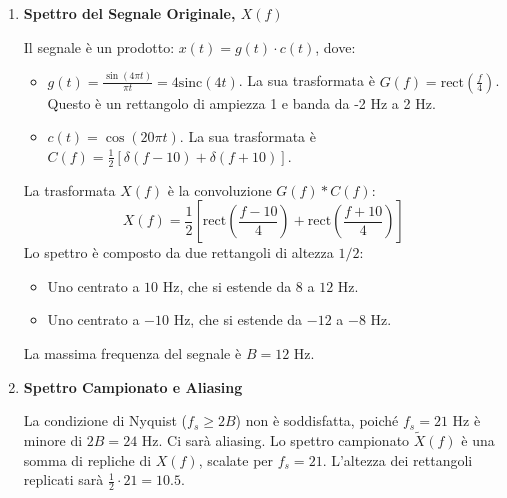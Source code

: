 
\begin{soluzione}{21}
    \begin{enumerate}
        \item \textbf{Spettro del Segnale Originale, $X(f)$}
        
        Il segnale è un prodotto: $x(t) = g(t) \cdot c(t)$, dove:
        \begin{itemize}
            \item $g(t) = \frac{\sin(4\pi t)}{\pi t} = 4\text{sinc}(4t)$. La sua trasformata è $G(f) = \text{rect}\left(\frac{f}{4}\right)$. Questo è un rettangolo di ampiezza 1 e banda da -2 Hz a 2 Hz.
            \item $c(t) = \cos(20\pi t)$. La sua trasformata è $C(f) = \frac{1}{2}[\delta(f-10) + \delta(f+10)]$.
        \end{itemize}
        La trasformata $X(f)$ è la convoluzione $G(f) * C(f)$:
        \[
            X(f) = \frac{1}{2} \left[ \text{rect}\left(\frac{f-10}{4}\right) + \text{rect}\left(\frac{f+10}{4}\right) \right]
        \]
        Lo spettro è composto da due rettangoli di altezza $1/2$:
        \begin{itemize}
            \item Uno centrato a $10$ Hz, che si estende da $8$ a $12$ Hz.
            \item Uno centrato a $-10$ Hz, che si estende da $-12$ a $-8$ Hz.
        \end{itemize}
        La massima frequenza del segnale è $B = 12$ Hz.

        \begin{center}
        \end{center}
        
        \item \textbf{Spettro Campionato e Aliasing}
        
        La condizione di Nyquist ($f_s \ge 2B$) non è soddisfatta, poiché $f_s = 21$ Hz è minore di $2B = 24$ Hz. Ci sarà aliasing. Lo spettro campionato $\tilde{X}(f)$ è una somma di repliche di $X(f)$, scalate per $f_s=21$. L'altezza dei rettangoli replicati sarà $\frac{1}{2} \cdot 21 = 10.5$.
        

\end{enumerate}
\end{soluzione}
